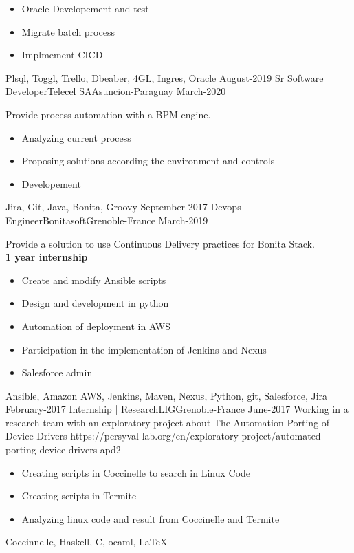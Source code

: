 \begin{experiences}
{\begin{itemize}
                          \item Oracle Developement and test
                          \item Migrate batch process
                          \item Implmement CICD
                       \end{itemize}
                  }
                      {Plsql, Toggl, Trello, Dbeaber, 4GL, Ingres, Oracle}
  \emptySeparator
 \experience
    {August-2019}   {Sr Software Developer}{Telecel SA}{Asuncion-Paraguay}
    {March-2020} {Provide process automation with a BPM engine.
                      \begin{itemize}
                          \item Analyzing current process
                          \item Proposing solutions according the environment and controls
                          \item Developement
                       \end{itemize}
                  }
                      {Jira, Git, Java, Bonita, Groovy}
  \emptySeparator
  \experience
    {September-2017}   {Devops Engineer}{Bonitasoft}{Grenoble-France}
    {March-2019}
                    {Provide a solution to use Continuous Delivery practices for Bonita Stack. \\
                    \textbf{\small 1 year internship}
                    \begin{itemize}
                        \item Create and modify Ansible scripts
                        \item Design and development in python
                        \item Automation of deployment in AWS
                        \item Participation in the implementation of Jenkins and Nexus
                        \item Salesforce admin
                      \end{itemize}}
                    {Ansible, Amazon AWS, Jenkins, Maven, Nexus, Python, git, Salesforce, Jira}
  \emptySeparator
    \projectexperiences
    {February-2017}   {Internship | Research}{LIG}{Grenoble-France}
    {June-2017}
                    {Working in a research team with an exploratory project about The Automation Porting of Device Drivers \tiny{https://persyval-lab.org/en/exploratory-project/automated-porting-device-drivers-apd2}}
                    {
                    \begin{itemize}
                        \item Creating scripts in Coccinelle to search in Linux Code
                        \item Creating scripts in Termite
                        \item Analyzing linux code and result from Coccinelle and Termite
                      \end{itemize}
                     }
                    {Coccinnelle, Haskell, C, ocaml, \LaTeX}
  \emptySeparator


\end{experiences}
